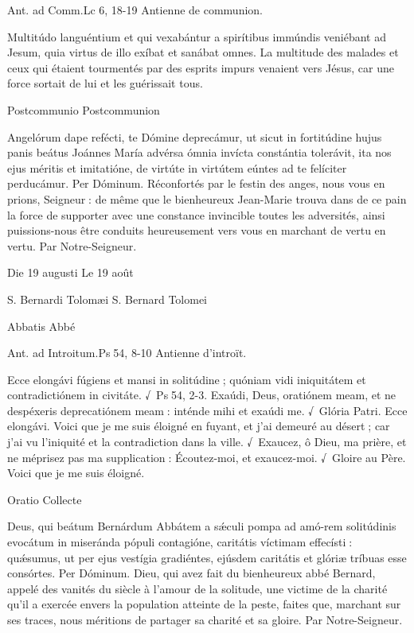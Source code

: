 \begin{paracol}{2}
Ant. ad Comm.\hfill Lc 6, 18-19
\switchcolumn
Antienne de communion.
\switchcolumn*

Multitúdo languéntium et qui vexabántur a spirítibus immúndis veniébant ad Jesum, quia virtus de illo exíbat et sanábat omnes.
\switchcolumn
La multitude des malades et ceux qui étaient tourmentés par des esprits impurs venaient vers Jésus, car une force sortait de lui et les guérissait tous.
\switchcolumn*

Postcommunio
\switchcolumn
Postcommunion
\switchcolumn*

Angelórum dape refécti, te Dómine  deprecámur, ut sicut in fortitúdine hujus panis beátus Joánnes María advérsa ómnia invícta constántia tolerávit, ita nos ejus méritis et imitatióne, de virtúte in virtútem eúntes ad te felíciter perducámur. Per Dóminum.
\switchcolumn
Réconfortés par le festin des anges, nous  vous en prions, Seigneur : de même que le bienheureux Jean-Marie trouva dans de ce pain la force de supporter avec une constance invincible toutes les adversités, ainsi puissions-nous être conduits heureusement vers vous en marchant de vertu en vertu. Par Notre-Seigneur.
\switchcolumn*

Die 19 augusti
\switchcolumn
Le 19 août
\switchcolumn*

S. Bernardi Tolomæi
\switchcolumn
S. Bernard Tolomei
\switchcolumn*

Abbatis
\switchcolumn
Abbé
\switchcolumn*

Ant. ad Introitum.\hfill Ps 54, 8-10
\switchcolumn
Antienne d’introït.
\switchcolumn*

Ecce elongávi fúgiens et mansi  in solitúdine ; quóniam vidi iniquitátem et contradictiónem in civitáte. √~Ps 54, 2-3. Exaúdi, Deus, oratiónem meam, et ne despéxeris deprecatiónem meam : inténde mihi et exaúdi me. √~Glória Patri. Ecce elongávi.
\switchcolumn
Voici que je me suis éloigné en fuyant,  et j’ai demeuré au désert ; car j’ai vu l’iniquité et la contradiction dans la ville. √~Exaucez, ô Dieu, ma prière, et ne méprisez pas ma supplication : Écoutez-moi, et exaucez-moi. √~Gloire au Père. Voici que je me suis éloigné.
\switchcolumn*

Oratio
\switchcolumn
Collecte
\switchcolumn*

Deus, qui beátum Bernárdum  Abbátem a sǽculi pompa ad amó-rem solitúdinis evocátum in miseránda pópuli contagióne, caritátis víctimam effecísti : quǽsumus, ut per ejus vestígia gradiéntes, ejúsdem caritátis et glóriæ tríbuas esse consórtes. Per Dóminum.
\switchcolumn
Dieu, qui avez fait du bienheureux abbé  Bernard, appelé des vanités du siècle à l’amour de la solitude, une victime de la charité qu’il a exercée envers la population atteinte de la peste, faites que, marchant sur ses traces, nous méritions de partager sa charité et sa gloire. Par Notre-Seigneur.
\switchcolumn*


\end{paracol}
